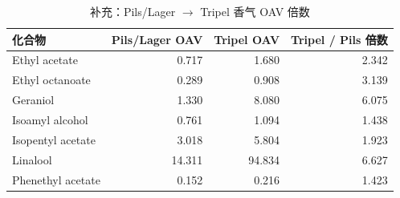 \begin{table}[tbp]
\centering
\caption{补充：Pils/Lager $\rightarrow$ Tripel 香气 OAV 倍数}
\label{tab:s05_q3_aroma}
\footnotesize
\setlength{\tabcolsep}{3.5pt}
\begin{tabular}{lrrr}
\toprule
化合物 & Pils/Lager OAV & Tripel OAV & Tripel / Pils 倍数 \\
\midrule
Ethyl acetate & 0.717 & 1.680 & 2.342 \\
Ethyl octanoate & 0.289 & 0.908 & 3.139 \\
Geraniol & 1.330 & 8.080 & 6.075 \\
Isoamyl alcohol & 0.761 & 1.094 & 1.438 \\
Isopentyl acetate & 3.018 & 5.804 & 1.923 \\
Linalool & 14.311 & 94.834 & 6.627 \\
Phenethyl acetate & 0.152 & 0.216 & 1.423 \\
\bottomrule
\end{tabular}
\end{table}

